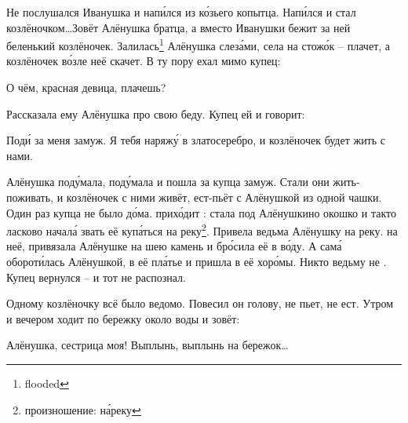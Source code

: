 %
Не послушался Иванушка и нап\'{и}лся из к\'{о}зьего копытца. Нап\'{и}лся и стал козлёночком\dots Зовёт Алёнушка братца, а вместо Иванушки бежит за ней беленький козлёночек. Залилась\footnote{flooded} Алёнушка слез\'{а}ми, села на стож\'{о}к -- плачет, а козлёночек в\'{о}зле неё скачет. В ту пору ехал мимо купец:
%
\begin{dialogue}
    \item О чём, красная девица, плачешь?
\end{dialogue}
Рассказала ему Алёнушка про свою беду. Купец ей и говорит:
\begin{dialogue}
    \item Под\'{и} за меня замуж. Я тебя наряж\'{у} в златосеребро, и козлёночек будет жить с нами.
\end{dialogue}
Алёнушка под\'{у}мала, под\'{у}мала и пошла за купца замуж. Стали они жить-поживать, и козлёночек с ними живёт, ест-пьёт с Алёнушкой из одной чашки. Один раз купца не было д\'{о}ма.  прих\'{о}дит : стала под Алёнушкино окошко и такто ласково начал\'{а} звать её куп\'{а}ться на реку\footnote{произношение: н\'{а}реку}. Привела ведьма Алёнушку на реку.  на неё, привязала Алёнушке на шею камень и бр\'{о}сила её в в\'{о}ду. А сам\'{а} оборот\'{и}лась Алёнушкой,  в её пл\'{а}тье и пришла в её хор\'{о}мы. Никто ведьму не . Купец вернулся -- и тот не распознал.

Одному козлёночку всё было ведомо. Повесил он голову, не пьет, не ест. Утром и вечером ходит по бережку около воды и зовёт:
\begin{dialogue}
    \item Алёнушка, сестрица моя! Выплынь, выплынь на бережок\dots
\end{dialogue}

